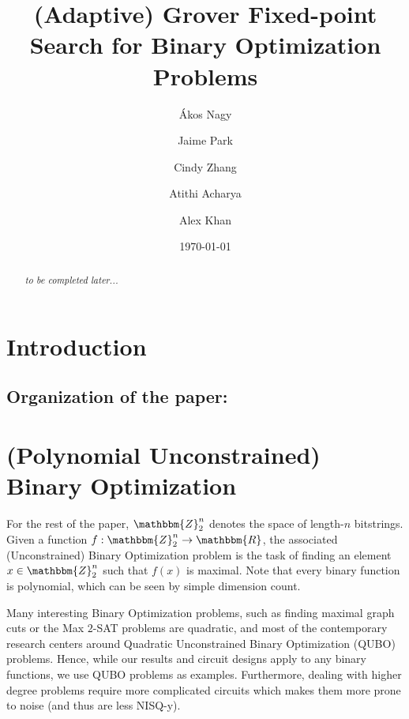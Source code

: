\documentclass[reqno,oneside,12pt]{amsart}  %
\title{(Adaptive) Grover Fixed-point Search for Binary Optimization Problems}
\date{\today}
\author{\'Akos Nagy}
\author{Jaime Park}
\author{Cindy Zhang}
\author{Atithi Acharya}
\author{Alex Khan}
\numberwithin{equation}{section}                %
\newtheorem*{acknowledgment}{Acknowledgments}
\def\rl{\mathbbm{R}}
\def\Z{\mathbbm{Z}}
\begin{document}
\begin{abstract}
	\textit{to be completed later...}
\end{abstract}

\maketitle

\section{Introduction}


\smallskip

\subsection*{Organization of the paper:} 

\begin{comment}
\smallskip

\begin{acknowledgment}
   
\end{acknowledgment}
\end{comment}

\bigskip

\section{(Polynomial Unconstrained) Binary Optimization}
\label{sec:qubos}

For the rest of the paper, $\Z_2^n$ denotes the space of length-$n$ bitstrings. Given a function $f : \Z_2^n \rightarrow \rl$, the associated (Unconstrained) Binary Optimization problem is the task of finding an element $x \in \Z_2^n$ such that $f (x)$ is maximal. Note that every binary function is polynomial, which can be seen by simple dimension count.

Many interesting Binary Optimization problems, such as finding maximal graph cuts or the Max $2$-SAT problems are quadratic, and most of the contemporary research centers around Quadratic Unconstrained  Binary Optimization (QUBO) problems. Hence, while our results and circuit designs apply to any binary functions, we use QUBO problems as examples. Furthermore, dealing with higher degree problems require more complicated circuits which makes them more prone to noise (and thus are less NISQ-y).
\end{document}
